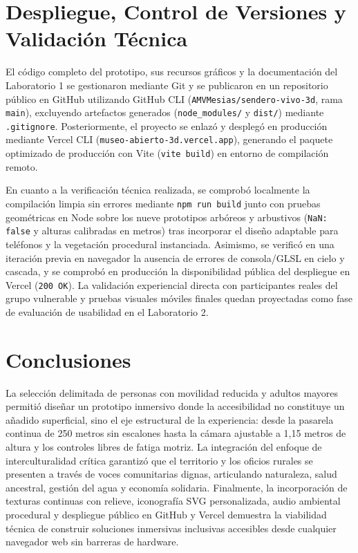 \documentclass[12pt,letterpaper]{article}
\begin{document}
\section{Despliegue, Control de Versiones y Validación Técnica}

El código completo del prototipo, sus recursos gráficos y la documentación del Laboratorio 1 se gestionaron mediante Git y se publicaron en un repositorio público en GitHub utilizando GitHub CLI (\texttt{AMVMesias/sendero-vivo-3d}, rama \texttt{main}), excluyendo artefactos generados (\texttt{node\_modules/} y \texttt{dist/}) mediante \texttt{.gitignore}. Posteriormente, el proyecto se enlazó y desplegó en producción mediante Vercel CLI (\texttt{museo-abierto-3d.vercel.app}), generando el paquete optimizado de producción con Vite (\texttt{vite build}) en entorno de compilación remoto.

En cuanto a la verificación técnica realizada, se comprobó localmente la compilación limpia sin errores mediante \texttt{npm run build} junto con pruebas geométricas en Node sobre los nueve prototipos arbóreos y arbustivos (\texttt{NaN: false} y alturas calibradas en metros) tras incorporar el diseño adaptable para teléfonos y la vegetación procedural instanciada. Asimismo, se verificó en una iteración previa en navegador la ausencia de errores de consola/GLSL en cielo y cascada, y se comprobó en producción la disponibilidad pública del despliegue en Vercel (\texttt{200 OK}). La validación experiencial directa con participantes reales del grupo vulnerable y pruebas visuales móviles finales quedan proyectadas como fase de evaluación de usabilidad en el Laboratorio 2.

\section{Conclusiones}

La selección delimitada de personas con movilidad reducida y adultos mayores permitió diseñar un prototipo inmersivo donde la accesibilidad no constituye un añadido superficial, sino el eje estructural de la experiencia: desde la pasarela continua de 250 metros sin escalones hasta la cámara ajustable a 1,15 metros de altura y los controles libres de fatiga motriz. La integración del enfoque de interculturalidad crítica garantizó que el territorio y los oficios rurales se presenten a través de voces comunitarias dignas, articulando naturaleza, salud ancestral, gestión del agua y economía solidaria. Finalmente, la incorporación de texturas continuas con relieve, iconografía SVG personalizada, audio ambiental procedural y despliegue público en GitHub y Vercel demuestra la viabilidad técnica de construir soluciones inmersivas inclusivas accesibles desde cualquier navegador web sin barreras de hardware.
\end{document}
